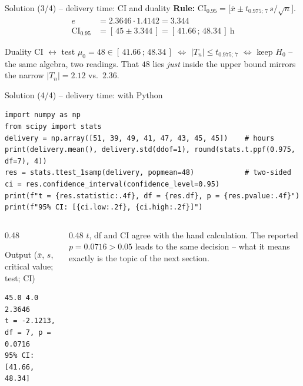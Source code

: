 \documentclass[aspectratio=169,11pt]{beamer}
\begin{document}
\begin{frame}{Solution (3/4) -- delivery time: CI and duality}
  \textbf{Rule:} $\text{CI}_{0.95}=\bigl[\bar x\pm t_{0.975;\,7}\,s/\sqrt n\bigr]$.
  \begin{align*}
    e &= 2.3646\cdot1.4142=3.344\\
    \text{CI}_{0.95} &= [\,45\pm3.344\,]=\mathbf{[\,41.66\,;\,48.34\,]}\ \text{h}
  \end{align*}
  \begin{block}{Duality CI $\leftrightarrow$ test}
    $\mu_0=48\in[\,41.66\,;\,48.34\,]$ $\Leftrightarrow$
    $|T_n|\le t_{0.975;\,7}$ $\Leftrightarrow$ keep $H_0$ -- the same algebra,
    two readings. That $48$ lies \emph{just} inside the upper bound mirrors the
    narrow $|T_n|=2.12$ vs.\ $2.36$.
  \end{block}
\end{frame}

\begin{frame}[fragile]{Solution (4/4) -- delivery time: with Python}
\begin{lstlisting}
import numpy as np
from scipy import stats
delivery = np.array([51, 39, 49, 41, 47, 43, 45, 45])    # hours
print(delivery.mean(), delivery.std(ddof=1), round(stats.t.ppf(0.975, df=7), 4))
res = stats.ttest_1samp(delivery, popmean=48)            # two-sided
ci = res.confidence_interval(confidence_level=0.95)
print(f"t = {res.statistic:.4f}, df = {res.df}, p = {res.pvalue:.4f}")
print(f"95% CI: [{ci.low:.2f}, {ci.high:.2f}]")
\end{lstlisting}
  \begin{columns}[T]
    \begin{column}{0.48\textwidth}
      \begin{block}{Output ($\bar x$, $s$, critical value; test; CI)}
\begin{lstlisting}[style=Pyout]
45.0 4.0 2.3646
t = -2.1213, df = 7, p = 0.0716
95% CI: [41.66, 48.34]
\end{lstlisting}
      \end{block}
    \end{column}
    \begin{column}{0.48\textwidth}
      \footnotesize $t$, df and CI agree with the hand calculation. The
      reported $p=0.0716>0.05$ leads to the same decision -- what it means
      exactly is the topic of the next section.
    \end{column}
  \end{columns}
\end{frame}
\end{document}
